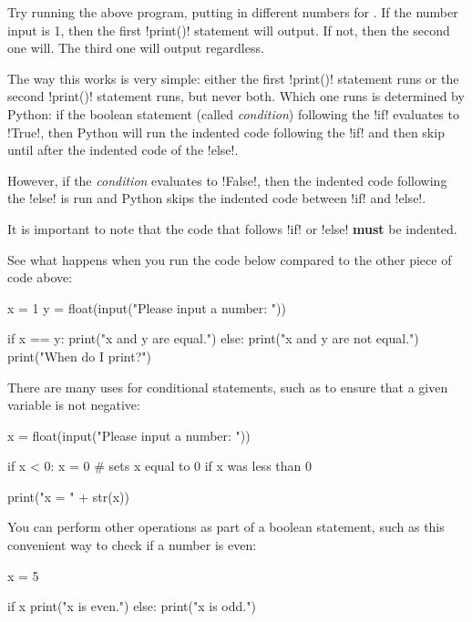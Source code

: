 \documentclass[11pt]{cselabheader}
\begin{document}
Try running the above program, putting in different numbers for
.  If the number input is 1, then the first
\pythoninline!print()!
statement will output. If not, then the second one will. The third one will
output regardless.

The way this works is very simple: either the first
\pythoninline!print()!
statement runs or the second \pythoninline!print()! statement runs, but never
both. Which one runs is determined by Python: if the boolean statement (called
\emph{condition}) following the \pythoninline!if! evaluates to
\pythoninline!True!, then Python will run the indented code following the
\pythoninline!if! and then skip until after the indented code of the
\pythoninline!else!.

However, if the \emph{condition} evaluates to \pythoninline!False!, then the
indented code following the \pythoninline!else! is run and Python skips the
indented code between \pythoninline!if! and \pythoninline!else!.

It is important to note that the code that follows \pythoninline!if! or
\pythoninline!else! \textbf{must} be indented.

See what happens when you run the code below compared to the other piece of code
above:

\begin{python3code}
x = 1
y = float(input("Please input a number: "))

if x == y:
    print("x and y are equal.")
else:
    print("x and y are not equal.")
    print("When do I print?")
\end{python3code}

There are many uses for conditional statements, such as to ensure that a given
variable is not negative:

\begin{python3code}
x = float(input("Please input a number: "))

if x < 0:
    x = 0 # sets x equal to 0 if x was less than 0

print("x = " + str(x))
\end{python3code}

You can perform other operations as part of a boolean statement, such as this
convenient way to check if a number is even:

\begin{python3code}
x = 5

if x %
    print("x is even.")
else:
    print("x is odd.")
\end{python3code}
\end{document}
